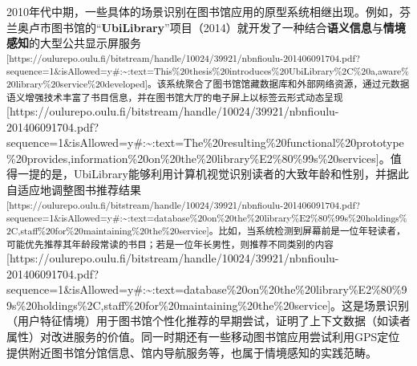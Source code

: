 \documentclass[
  letterpaper,
]{scrbook}
\begin{document}
2010年代中期，一些具体的场景识别在图书馆应用的原型系统相继出现。例如，芬兰奥卢市图书馆的``\textbf{UbiLibrary}''项目（2014）就开发了一种结合\textbf{语义信息}与\textbf{情境感知}的大型公共显示屏服务\textsuperscript{{[}https://oulurepo.oulu.fi/bitstream/handle/10024/39921/nbnfioulu-201406091704.pdf?sequence=1\&isAllowed=y\#:\textasciitilde:text=This\%20thesis\%20introduces\%20UbiLibrary\%2C\%20a,aware\%20library\%20service\%20developed{]}。该系统聚合了图书馆馆藏数据库和外部网络资源，通过元数据语义增强技术丰富了书目信息，并在图书馆大厅的电子屏上以标签云形式动态呈现}{[}https://oulurepo.oulu.fi/bitstream/handle/10024/39921/nbnfioulu-201406091704.pdf?sequence=1\&isAllowed=y\#:\textasciitilde:text=The\%20resulting\%20functional\%20prototype\%20provides,information\%20on\%20the\%20library\%E2\%80\%99s\%20services{]}。值得一提的是，UbiLibrary能够利用计算机视觉识别读者的大致年龄和性别，并据此自适应地调整图书推荐结果\textsuperscript{{[}https://oulurepo.oulu.fi/bitstream/handle/10024/39921/nbnfioulu-201406091704.pdf?sequence=1\&isAllowed=y\#:\textasciitilde:text=database\%20on\%20the\%20library\%E2\%80\%99s\%20holdings\%2C,staff\%20for\%20maintaining\%20the\%20service{]}。比如，当系统检测到屏幕前是一位年轻读者，可能优先推荐其年龄段常读的书目；若是一位年长男性，则推荐不同类别的内容}{[}https://oulurepo.oulu.fi/bitstream/handle/10024/39921/nbnfioulu-201406091704.pdf?sequence=1\&isAllowed=y\#:\textasciitilde:text=database\%20on\%20the\%20library\%E2\%80\%99s\%20holdings\%2C,staff\%20for\%20maintaining\%20the\%20service{]}。这是场景识别（用户特征情境）用于图书馆个性化推荐的早期尝试，证明了上下文数据（如读者属性）对改进服务的价值。同一时期还有一些移动图书馆应用尝试利用GPS定位提供附近图书馆分馆信息、馆内导航服务等，也属于情境感知的实践范畴。
\end{document}
